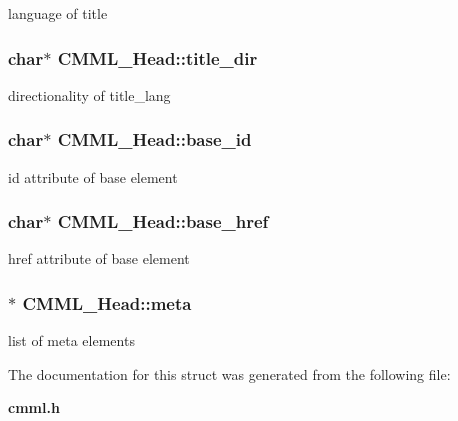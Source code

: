 language of title 
\subsubsection{\setlength{\rightskip}{0pt plus 5cm}char$\ast$ {\bf CMML\_\-Head::title\_\-dir}}\label{structCMML__Head_o7}


directionality of title\_\-lang 
\subsubsection{\setlength{\rightskip}{0pt plus 5cm}char$\ast$ {\bf CMML\_\-Head::base\_\-id}}\label{structCMML__Head_o8}


id attribute of base element 
\subsubsection{\setlength{\rightskip}{0pt plus 5cm}char$\ast$ {\bf CMML\_\-Head::base\_\-href}}\label{structCMML__Head_o9}


href attribute of base element 
\subsubsection{$\ast$ {\bf CMML\_\-Head::meta}}\label{structCMML__Head_o10}


list of meta elements 

The documentation for this struct was generated from the following file:\begin{CompactItemize}
\item 
{\bf cmml.h}\end{CompactItemize}
